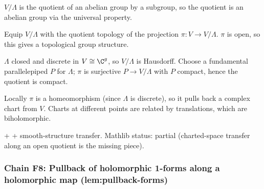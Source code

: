 \begin{lemma}
\label{lem:ctp-r1}
$V/\Lambda$ is the quotient of an abelian group by a subgroup, so the quotient is an abelian group via the universal property.
\leanok
\end{lemma}

\begin{lemma}
\label{lem:ctp-r2}
Equip $V/\Lambda$ with the quotient topology of the projection $\pi : V \to V/\Lambda$.  $\pi$ is open, so this gives a topological group structure.
\leanok
\end{lemma}

\begin{lemma}
\label{lem:ctp-r3}
$\Lambda$ closed and discrete in $V \cong \C^{g}$, so $V/\Lambda$ is Hausdorff.  Choose a fundamental parallelepiped $P$ for $\Lambda$; $\pi$ is surjective $P \to V/\Lambda$ with $P$ compact, hence the quotient is compact.
\leanok
\end{lemma}

\begin{lemma}
\label{lem:ctp-r4}
Locally $\pi$ is a homeomorphism (since $\Lambda$ is discrete), so it pulls back a complex chart from $V$.  Charts at different points are related by translations, which are biholomorphic.
\leanok
\end{lemma}

\begin{lemma}
\label{lem:ctp-r5}
 +  +  smooth-structure transfer.  Mathlib status: partial (charted-space transfer along an open quotient is the missing piece).
\leanok
\end{lemma}

\subsubsection*{Chain F8: Pullback of holomorphic 1-forms along a holomorphic map (lem:pullback-forms)}

